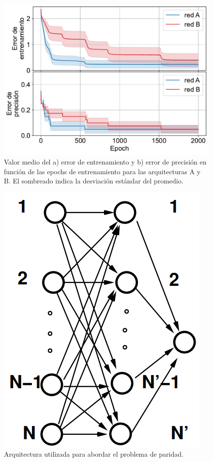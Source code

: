 \documentclass[aps,prb,twocolumn,superscriptaddress,floatfix,longbibliography]{revtex4-2}
\newcounter{para}
\begin{document}
\begin{figure}[h]
    \includegraphics[clip=true,width=\columnwidth]{ej1_vs_epochs.pdf}
    \caption{Valor medio del a) error de entrenamiento y b) error de precisión en función de las epochs de entrenamiento para las arquitecturas A y B. El sombreado indica la desviación estándar del promedio.}
     \label{fig:ej1_error}
\end{figure}

\begin{figure}[h]
    \includegraphics[clip=true,width=0.5\columnwidth]{ej2_arquitectura.png}
    \caption{Arquitectura utilizada para abordar el problema de paridad.}
     \label{fig:ej2_arquitectura}
\end{figure}
\end{document}
